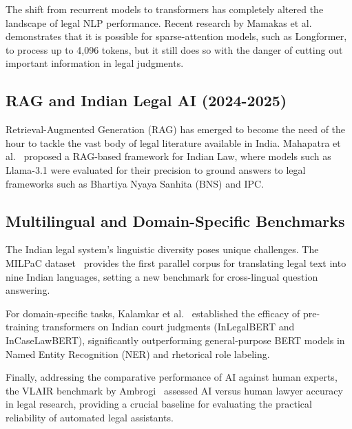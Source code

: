 \documentclass{llncs}
\begin{document}
The shift from recurrent models to transformers has completely altered the landscape of legal NLP performance. Recent research by Mamakas et al.~\cite{mamakas2025processing} demonstrates that it is possible for sparse-attention models, such as Longformer, to process up to 4,096 tokens, but it still does so with the danger of cutting out important information in legal judgments.

\subsection{RAG and Indian Legal AI (2024-2025)}

Retrieval-Augmented Generation (RAG) has emerged to become the need of the hour to tackle the vast body of legal literature available in India. Mahapatra et al.~\cite{mahapatra2025redefining} proposed a RAG-based framework for Indian Law, where models such as Llama-3.1 were evaluated for their precision to ground answers to legal frameworks such as Bhartiya Nyaya Sanhita (BNS) and IPC.

\subsection{Multilingual and Domain-Specific Benchmarks}

The Indian legal system's linguistic diversity poses unique challenges. The MILPaC dataset~\cite{milpac2025} provides the first parallel corpus for translating legal text into nine Indian languages, setting a new benchmark for cross-lingual question answering. 

For domain-specific tasks, Kalamkar et al.~\cite{kalamkar2022ner} established the efficacy of pre-training transformers on Indian court judgments (InLegalBERT and InCaseLawBERT), significantly outperforming general-purpose BERT models in Named Entity Recognition (NER) and rhetorical role labeling.

Finally, addressing the comparative performance of AI against human experts, the VLAIR benchmark by Ambrogi~\cite{vlair2025} assessed AI versus human lawyer accuracy in legal research, providing a crucial baseline for evaluating the practical reliability of automated legal assistants.
\end{document}
